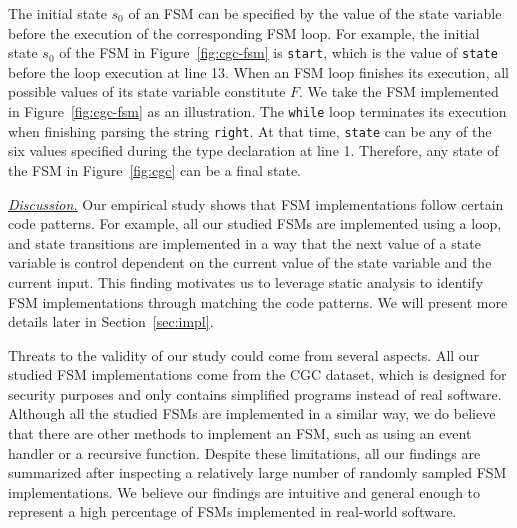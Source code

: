 The initial state $s_0$ of an FSM can be specified
by the value of the state variable before 
the execution of the corresponding 
FSM loop.
For example, the initial state $s_0$ of the FSM in Figure~\ref{fig:cgc-fsm}
is \texttt{start}, which is the value of \texttt{state}
before the loop execution at line 13.
When an FSM loop finishes its execution,
all possible values of its state variable
constitute $F$.
We take the FSM implemented in Figure~\ref{fig:cgc-fsm} as an illustration. 
The \texttt{while} loop terminates its execution when 
finishing parsing the string \texttt{right}. 
At that time, \texttt{state} can be any of the six values specified
during the type declaration at line 1. 
Therefore, any state of the FSM in
Figure~\ref{fig:cgc} can be a final state.


\noindent\underline{{\textit{Discussion.}}}
Our empirical study shows that FSM implementations follow certain 
code patterns. For example, all our studied FSMs are implemented using a loop, 
and state transitions are implemented in a way that 
the next value of a state variable is control dependent 
on the current value of the state variable 
and the current input. 
This finding motivates us to leverage static analysis to 
identify FSM implementations 
through matching the code patterns. 
We will present more details later in Section~\ref{sec:impl}.

Threats to the validity of our study could come from several aspects. 
All our studied FSM implementations come from the CGC dataset,
which is designed for security purposes and only contains simplified programs 
instead of real software. 
Although all the studied FSMs are implemented in a similar way, 
we do believe that there are other methods to implement an FSM, 
such as using an event handler or a recursive function. 
Despite these limitations, all our findings are summarized 
after inspecting a relatively large number of randomly sampled FSM implementations. 
We believe our findings are intuitive and general enough to represent a high percentage 
of FSMs implemented in real-world software. 









